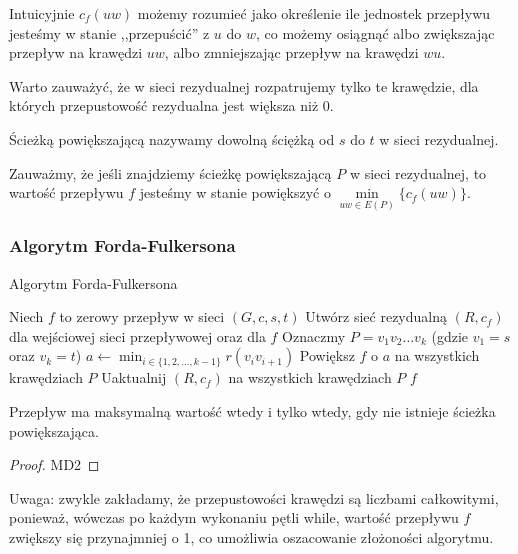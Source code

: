 Intuicyjnie $c_f(uw)$ możemy
rozumieć jako określenie ile jednostek przepływu 
jesteśmy w stanie ,,przepuścić'' z $u$ do $w$, co
możemy osiągnąć albo zwiększając przepływ na krawędzi $uw$,
albo zmniejszając przepływ na krawędzi $wu$.

Warto zauważyć, że w sieci rezydualnej rozpatrujemy tylko te 
krawędzie, dla których przepustowość rezydualna jest większa niż 0.

\begin{defi}
	Ścieżką powiększającą nazywamy dowolną ściężką od $s$
	do $t$ w sieci rezydualnej. 
\end{defi}

Zauważmy, że jeśli znajdziemy ścieżkę powiększającą $P$ 
w sieci rezydualnej,
to wartość przepływu $f$ jesteśmy w stanie powiększyć o 
$\min\limits_{uw \in E(P)} \{c_f(uw)\}$.

\subsubsection{Algorytm Forda-Fulkersona}

\begin{algorithm}[H]
	\caption{Algorytm Forda-Fulkersona}\label{ford-fulker_alg}
	\begin{algorithmic}[1]
		\State Niech $f$ to zerowy przepływ w sieci $(G,c,s,t)$
		\State Utwórz sieć rezydualną $(R, c_f)$ dla wejściowej 
		sieci przepływowej oraz dla $f$ 
		\State Oznaczmy $P = v_1v_2\dots v_k$ (gdzie $v_1 = s$ oraz $v_k = t$)
		\State $a \gets \min_{i \in \{1, 2, \dots, k-1\}} r(v_iv_{i+1})$
		\State Powiększ $f$ o $a$ na wszystkich krawędziach $P$
		\State Uaktualnij $(R, c_f)$ na wszystkich krawędziach $P$
		\EndWhile
		\State \Return $f$
		\EndProcedure
	\end{algorithmic}
\end{algorithm}

\begin{theorem}
	 Przepływ ma maksymalną wartość wtedy i tylko 
	wtedy, gdy nie istnieje ścieżka powiększająca.
	\begin{proof}
		MD2
	\end{proof}
\end{theorem}

Uwaga: zwykle 
zakładamy, że przepustowości krawędzi są liczbami całkowitymi, 
ponieważ, wówczas po każdym 
wykonaniu pętli while, wartość przepływu $f$ zwiększy się
przynajmniej o 1, co umożliwia oszacowanie
złożoności algorytmu. 

